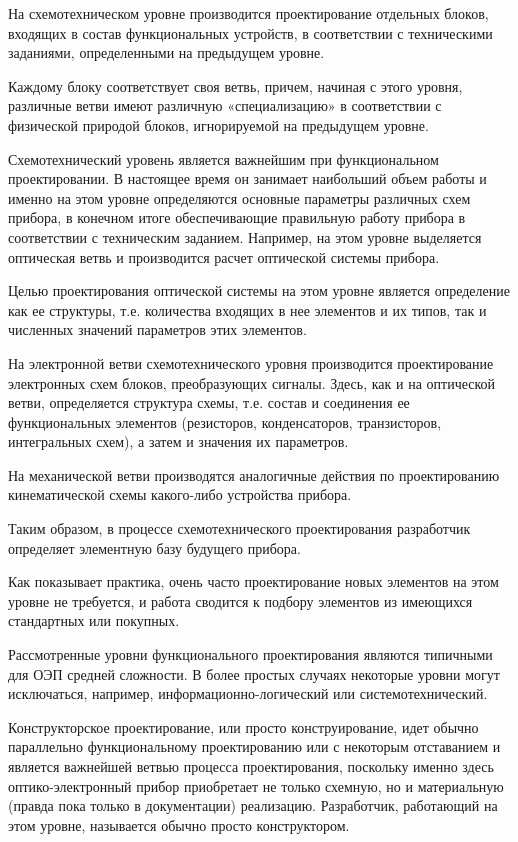 На схемотехническом уровне производится проектирование отдельных блоков, входящих в состав функциональных устройств, в соответствии с техническими заданиями, определенными на предыдущем уровне.

Каждому блоку соответствует своя ветвь, причем, начиная с этого уровня, различные ветви имеют различную «специализацию» в соответствии с физической природой блоков, игнорируемой на предыдущем уровне.

Схемотехнический уровень является важнейшим при функциональном проектировании. 
В настоящее время он занимает наибольший объем работы и именно на этом уровне определяются основные параметры различных схем прибора, в конечном итоге обеспечивающие правильную работу прибора в соответствии с техническим заданием. 
Например, на этом уровне выделяется оптическая ветвь и производится расчет оптической системы прибора.

Целью проектирования оптической системы на этом уровне является определение как ее структуры, т.е. количества входящих в нее элементов и их типов, так и численных значений параметров этих элементов.

На электронной ветви схемотехнического уровня производится проектирование электронных схем блоков, преобразующих сигналы. 
Здесь, как и на оптической ветви, определяется структура схемы, т.е. состав и соединения ее функциональных элементов (резисторов, конденсаторов, транзисторов, интегральных схем), а затем и значения их параметров.

На механической ветви производятся аналогичные действия по проектированию кинематической схемы какого-либо устройства прибора.

Таким образом, в процессе схемотехнического проектирования разработчик определяет элементную базу будущего прибора.

Как показывает практика, очень часто проектирование новых элементов на этом уровне не требуется, и работа сводится к подбору элементов из имеющихся стандартных или покупных.

Рассмотренные уровни функционального проектирования являются типичными для ОЭП средней сложности. 
В более простых случаях некоторые уровни могут исключаться, например, информационно-логический или системотехнический.

Конструкторское проектирование, или просто конструирование, идет обычно параллельно функциональному проектированию или с некоторым отставанием и является важнейшей ветвью процесса проектирования, поскольку именно здесь оптико-электронный прибор приобретает не только схемную, но и материальную (правда пока только в документации) реализацию. 
Разработчик, работающий на этом уровне, называется обычно просто конструктором. 


